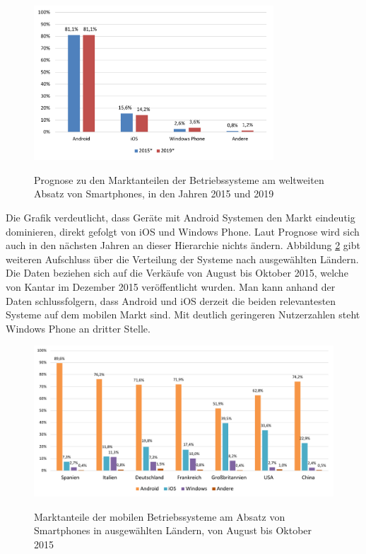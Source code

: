 \begin{figure}[htbp]
	\centering
	\includegraphics[width=0.8\textwidth]{Bilder/Marktanteile_Betriebssysteme}
	\caption{Prognose zu den Marktanteilen der Betriebssysteme am weltweiten Absatz von Smartphones, in den Jahren 2015 und 2019}\label{graph_mobile_systems}\citep{marktanteile_betriebssysteme}
\end{figure}

Die Grafik verdeutlicht, dass Geräte mit Android Systemen den Markt eindeutig dominieren, direkt gefolgt von iOS und Windows Phone. Laut Prognose wird sich auch in den nächsten Jahren an dieser Hierarchie nichts ändern.
Abbildung \ref{graph_mobile_systems_laender} gibt weiteren Aufschluss über die Verteilung der Systeme nach ausgewählten Ländern. Die Daten beziehen sich auf die Verkäufe von August bis Oktober 2015, welche von Kantar \citep{marktanteile_betriebssysteme_laender} im Dezember 2015 veröffentlicht wurden. 
Man kann anhand der Daten schlussfolgern, dass Android und iOS derzeit die beiden relevantesten Systeme auf dem mobilen Markt sind. Mit deutlich geringeren Nutzerzahlen steht Windows Phone an dritter Stelle. 

\begin{figure}[htbp]
	\centering
	\includegraphics[width=1\textwidth]{Bilder/Marktanteile_nach_Laendern}
	\caption{Marktanteile der mobilen Betriebssysteme am Absatz von Smartphones in ausgewählten Ländern, von August bis Oktober 2015}\label{graph_mobile_systems_laender}\citep{marktanteile_betriebssysteme_laender}
\end{figure}

